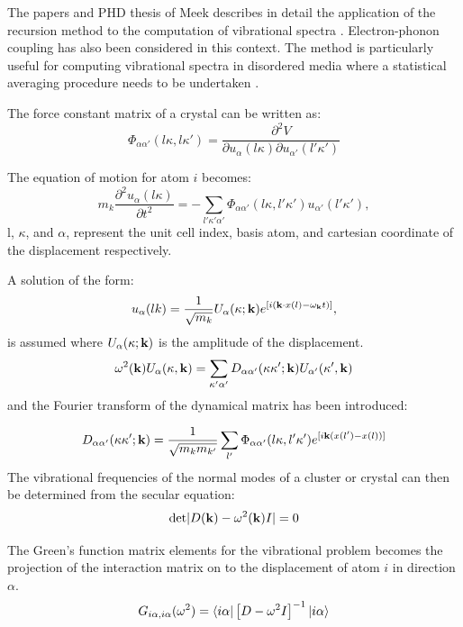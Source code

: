 The papers and PHD thesis of Meek describes in detail the 
application of the recursion method to the computation of 
vibrational spectra \cite{meek76, meek78}. Electron-phonon coupling has also been
considered in this context\cite{terakura78}. The method is particularly useful for
computing vibrational spectra in disordered media 
where a statistical averaging procedure needs to be undertaken \cite{mookerjee04}.

The force constant matrix of a crystal can be written as:
%
\begin{equation}
\label{eq:forceconstant}
\Phi_{\alpha\alpha'}(l\kappa,l\kappa') = \frac{\partial^{2}V}{\partial u_{\alpha}(l\kappa) \partial u_{\alpha'}(l'\kappa')}
\end{equation}
%

The equation of motion for atom $i$ becomes:
%
\begin{equation}
m_{k} \frac{\partial^{2} u_\alpha (l\kappa)}{\partial t^{2}} = - \sum_{l'\kappa'\alpha'}
\Phi_{\alpha\alpha'}(l\kappa,l'\kappa')u_{\alpha'}(l'\kappa'),
\end{equation}
%
l, $\kappa$, and $\alpha$, represent the unit cell index, basis atom, and 
cartesian coordinate of the displacement respectively.

A solution of the form:
%
\begin{equation}
u_{\alpha}(lk) = \frac{1}{\sqrt{m_{k}}} U_{\alpha}(\kappa;{\bf k})e^{[i({\bf k}\cdot x(l) - \omega_{{\bf k}}t)]},
\end{equation}
%
is assumed where $U_{\alpha}(\kappa;{\bf k})$ is the amplitude of the displacement.
%
\begin{equation}
\omega^{2}({\bf k}) U_{\alpha}(\kappa, {\bf k}) = \sum_{\kappa'\alpha'}D_{\alpha\alpha'}(\kappa\kappa';{\bf k}) U_{\alpha'}(\kappa',{\bf k})
\end{equation}
%
and the Fourier transform of the dynamical matrix has been introduced:

\begin{equation}
D_{\alpha\alpha'}(\kappa\kappa';{\bf k}) = \frac{1}{\sqrt{m_{k}m_{k'}}} \sum_{l'} \Phi_{\alpha\alpha'}(l\kappa,l'\kappa') e^{[i{\bf k}(x(l')-x(l))]}
\end{equation}
%
The vibrational frequencies of the normal modes of a cluster or crystal can then be determined 
from the secular equation:
%
\begin{equation}
{\rm det}|D({\bf k}) - \omega^{2}({\bf k})I| = 0
\end{equation}
%

The Green's function matrix elements for the vibrational problem 
becomes the projection of the interaction matrix on to the 
displacement of atom $i$ in direction $\alpha$.
%
\begin{equation}
G_{i\alpha,i\alpha}(\omega^{2})= \langle i\alpha| \left[D- \omega^{2}I\right]^{-1} |i\alpha \rangle
\end{equation}
%


